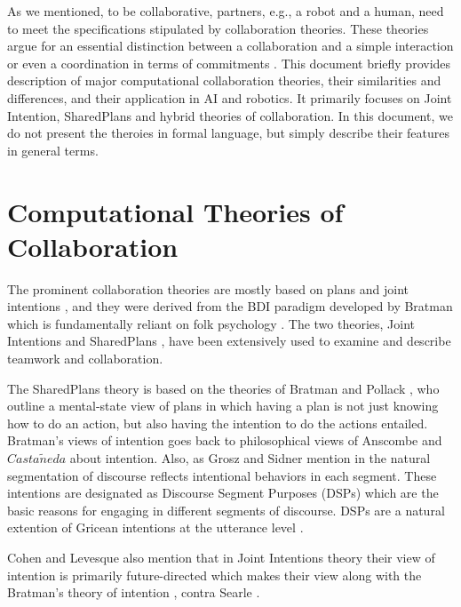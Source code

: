 \documentclass[11pt]{article}
\begin{document}
As we mentioned, to be collaborative, partners, e.g., a robot and a human, need
to meet the specifications stipulated by collaboration theories. These theories
argue for an essential distinction between a collaboration and a simple
interaction or even a coordination in terms of commitments
\cite{grosz:shared-plans, lochbaum:collaborative-planning}. This document
briefly provides description of major computational collaboration theories,
their similarities and differences, and their application in AI and robotics. It
primarily focuses on Joint Intention, SharedPlans and hybrid theories of
collaboration. In this document, we do not present the theroies in formal
language, but simply describe their features in general terms.

\section{Computational Theories of Collaboration}

The prominent collaboration theories are mostly based on plans and joint
intentions \cite{cohen:teamwork} \cite{grosz:plans-discourse}
\cite{Litman:discourse-commonsense}, and they were derived from the BDI
paradigm developed by Bratman \cite{bratman:intentions-plans} which is
fundamentally reliant on folk psychology \cite{ravenscroft:folk}. The two
theories, Joint Intentions \cite{cohen:teamwork} and SharedPlans
\cite{grosz:plans-discourse}, have been extensively used to examine and describe
teamwork and collaboration.

The SharedPlans theory is based on the theories of Bratman and Pollack
\cite{bratman:plans-reasoning,pollack:plan-inference,
pollack:plan-mental-attitudes}, who outline a mental-state view of plans in
which having a plan is not just knowing how to do an action, but also having the
intention to do the actions entailed. Bratman's views of intention goes back to
philosophical views of Anscombe \cite{anscombe:intention} and
$Casta\tilde{n}eda$ \cite{castaneda:thinking} about intention. Also, as Grosz
and Sidner mention in \cite{grosz:plans-discourse} the natural segmentation of
discourse reflects intentional behaviors in each segment. These intentions are
designated as Discourse Segment Purposes (DSPs) which are the basic reasons for
engaging in different segments of discourse. DSPs are a natural extention of
Gricean intentions at the utterance level \cite{neale:grice-language}.

Cohen and Levesque also mention that in Joint Intentions theory their view of
intention is primarily future-directed \cite{cohen:intention-commitment} which
makes their view along with the Bratman's theory of intention
\cite{bratman:intention}, contra Searle \cite{searle:collective}.\\
\end{document}
